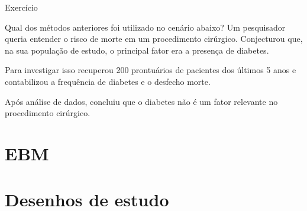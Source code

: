 \documentclass{beamer}
\begin{document}




\begin{frame}{Exercício}
  \begin{block}{Qual dos métodos anteriores foi utilizado no cenário abaixo?}
    Um pesquisador queria entender o risco de morte em um procedimento cirúrgico.
Conjecturou que, na sua população de estudo, o principal fator era a presença de diabetes.

Para investigar isso recuperou 200 prontuários de pacientes dos últimos 5 anos e contabilizou a frequência de diabetes e o desfecho morte.

Após análise de dados, concluiu que o diabetes não é um fator relevante no procedimento cirúrgico.
  \end{block}
\end{frame}

\section{EBM}

\section{Desenhos de estudo}
\end{document}
